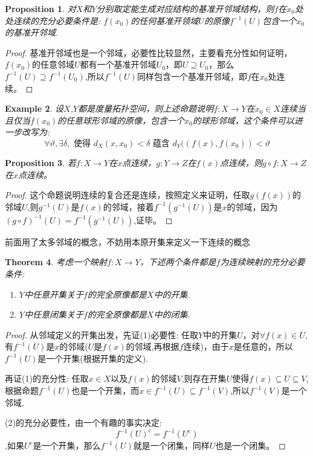 \documentclass{article}
\newtheorem{theorem}{Theorem}[section]
\newtheorem{proposition}[theorem]{Proposition}
\newtheorem{example}[theorem]{Example}
\newcommand*{\xfunc}[4]{{#2}\colon{#3}{#1}{#4}}
\newcommand*{\func}[3]{\xfunc{\to}{#1}{#2}{#3}}
\begin{document}
\begin{proposition}
对$X$和$Y$分别取定能生成对应结构的基准开邻域结构，则$f$在$x_0$处处连续的充分必要条件是: $f(x_0)$的任何基准开领域$U$的原像$f^{-1}(U)$包含一个$x_0$的基准开邻域.
\end{proposition}

\begin{proof}
基准开邻域也是一个邻域，必要性比较显然，主要看充分性如何证明，$f(x_0)$的任意邻域$U$都有一个基准开邻域$U_0$，即$U \supseteq U_0$，那么$f^{-1}(U) \supseteq f^{-1}(U_0)$,所以$f^{-1}(U)$同样包含一个基准开邻域，即$f$在$x_0$处连续。
\end{proof}

\begin{example}
设$X$,$Y$都是度量拓扑空间，则上述命题说明$\func{f}{X}{Y}$在$x_0 \in X$连续当且仅当$f(x_0)$的任意球形邻域的原像，包含一个$x_0$的球形邻域，这个条件可以进一步改写为:\[\forall \vartheta ,\exists \delta,\text{ 使得 } d_X(x,x_0) < \delta \text{ 蕴含 }d_Y((f(x),f(x_0)) < \vartheta\]
\end{example}

\begin{proposition}
若$\func{f}{X}{Y}$在$x$点连续，$\func{g}{Y}{Z}$在$f(x)$点连续，则$\func{g \circ f}{X}{Z}$在$x$点连续。
\end{proposition}

\begin{proof}
这个命题说明连续的复合还是连续，按照定义来证明，任取$g(f(x))$的邻域$U$,则$g^{-1}(U)$是$f(x)$的邻域，接着$f^{-1}(g^{-1}(U))$是$x$的邻域，因为$(g \circ f)^{-1}(U)=f^{-1}(g^{-1}(U))$,证毕。
\end{proof}

前面用了太多邻域的概念，不妨用本原开集来定义一下连续的概念

\begin{theorem}
考虑一个映射$\func{f}{X}{Y}$，下述两个条件都是$f$为连续映射的充分必要条件:
\begin{enumerate}
	\item $Y$中任意开集关于$f$的完全原像都是$X$中的开集.
	\item $Y$中任意闭集关于$f$的完全原像都是$X$中的闭集.
\end{enumerate}
\end{theorem}

\begin{proof}
从邻域定义的开集出发，先证(1)必要性: 任取$Y$中的开集$U$，对$\forall f(x) \in U$,有$f^{-1}(U)$是$x$的邻域($U$是$f(x)$的邻域,再根据$f$连续)，由于$x$是任意的，所以$f^{-1}(U)$是一个开集(根据开集的定义).

再证(1)的充分性: 任取$x \in X$以及$f(x)$的邻域$V$,则存在开集$U$使得$f(x) \subseteq U \subseteq V$,根据命题$f^{-1}(U)$也是一个开集，而$x \in f^{-1}(U) \subseteq f^{-1}(V)$,所以$f^{-1}(V)$是一个邻域.	

(2)的充分必要性，由一个有趣的事实决定: \[f^{-1}(U)^c  = f^{-1}(U^c)\],如果$U^c$是一个开集，那么$f^{-1}(U)$就是一个闭集，同样$U$也是一个闭集。
\end{proof}
\end{document}
